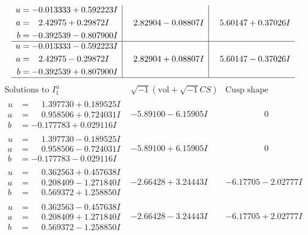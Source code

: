 \documentclass[1p]{elsarticle_modified}
\theoremstyle{definition}
\newcommand{\I}{\sqrt{-1}}
\begin{document}
$$\begin{array}{c|c|c}
\begin{aligned}
u &= -0.013333 + 0.592223 I \\
a &= \phantom{-}2.42975 + 0.29872 I \\
b &= -0.392539 - 0.807900 I\end{aligned}
 & \phantom{-}2.82904 - 0.08807 I & \phantom{-}5.60147 + 0.37026 I \\ \hline\begin{aligned}
u &= -0.013333 - 0.592223 I \\
a &= \phantom{-}2.42975 - 0.29872 I \\
b &= -0.392539 + 0.807900 I\end{aligned}
 & \phantom{-}2.82904 + 0.08807 I & \phantom{-}5.60147 - 0.37026 I\\
 \hline 
 \end{array}$$\newpage$$\begin{array}{c|c|c}  
\text{Solutions to }I^u_{1}& \I (\text{vol} + \sqrt{-1}CS) & \text{Cusp shape}\\
 \hline 
\begin{aligned}
u &= \phantom{-}1.397730 + 0.189525 I \\
a &= \phantom{-}0.958506 + 0.724031 I \\
b &= -0.177783 + 0.029116 I\end{aligned}
 & -5.89100 - 6.15905 I & \phantom{-0.000000 } 0 \\ \hline\begin{aligned}
u &= \phantom{-}1.397730 - 0.189525 I \\
a &= \phantom{-}0.958506 - 0.724031 I \\
b &= -0.177783 - 0.029116 I\end{aligned}
 & -5.89100 + 6.15905 I & \phantom{-0.000000 } 0 \\ \hline\begin{aligned}
u &= \phantom{-}0.362563 + 0.457638 I \\
a &= \phantom{-}0.208409 - 1.271840 I \\
b &= \phantom{-}0.569372 + 1.258850 I\end{aligned}
 & -2.66428 + 3.24443 I & -6.17705 - 2.02777 I \\ \hline\begin{aligned}
u &= \phantom{-}0.362563 - 0.457638 I \\
a &= \phantom{-}0.208409 + 1.271840 I \\
b &= \phantom{-}0.569372 - 1.258850 I\end{aligned}
 & -2.66428 - 3.24443 I & -6.17705 + 2.02777 I \\ \hline\begin{aligned}

\end{aligned}
\end{array}$$
\end{document}
